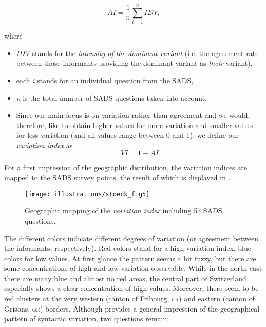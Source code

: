 \documentclass[output=paper]{LSP/langsci}
\begin{document}
\begin{equation}
\mathit{AI}=\frac{1}{n}\sum _{i=1}^{n}{{\mathit{IDV}}_{i}}
\end{equation}

where

\begin{itemize}
\item \emph{IDV} stands for the \emph{intensity of the dominant variant} (i.e. the agreement rate between those informants providing the dominant variant as \emph{their} variant),

\item each \emph{i} stands for an individual question from the SADS,

\item \emph{n} is the total number of SADS questions taken into account.

\item Since our main focus is on variation rather than agreement and we would, therefore, like to obtain higher values for more variation and smaller values for less variation (and all values range between 0 and 1), we define our \emph{variation index} as\\
\begin{equation}
\mathit{VI}=1-\mathit{AI}
\end{equation}
\end{itemize}

For a first impression of the geographic distribution, the variation indices are mapped to the SADS survey points, the result of which is displayed in .

\begin{figure}
\texttt{[image: illustrations/stoeck\_fig5]}
\label{fig:5}
\caption{Geographic mapping of the \emph{variation index} including 57 SADS questions.}
\end{figure}

The different colors indicate different degrees of variation (or agreement between the informants, respectively). Red colors stand for a high variation index, blue colors for low values. At first glance the pattern seems a bit fuzzy, but there are some concentrations of high and low variation observable. While in the north-east there are many blue and almost no red areas, the central part of Switzerland especially shows a clear concentration of high values. Moreover, there seem to be red clusters at the very western (canton of Fribourg, \textsc{fr}) and eastern (canton of Grisons, \textsc{gr}) borders. Although  provides a general impression of the geographical pattern of syntactic variation, two questions remain:
\end{document}

